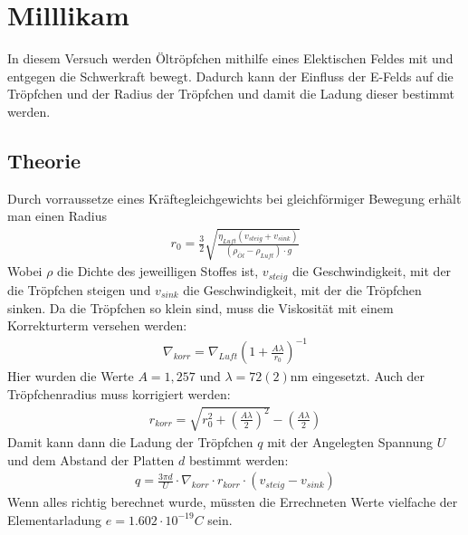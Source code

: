 \documentclass[11pt, a4paper]{article}
\begin{document}
\begin{table}[H]
    

    \section{Milllikam}

    In diesem Versuch werden Öltröpfchen mithilfe eines Elektischen Feldes mit und entgegen die Schwerkraft bewegt. Dadurch kann der Einfluss der E-Felds auf die Tröpfchen und der Radius der Tröpfchen und damit die Ladung dieser bestimmt werden.

    \subsection{Theorie}

    Durch vorraussetze eines Kräftegleichgewichts bei gleichförmiger Bewegung erhält man einen Radius
    \begin{align}
        r_0 = \frac{3}{2} \sqrt{\frac{\eta_{Luft} (v_{steig} + v_{sink})}{(\rho_{\ddot{Ol}} - \rho_{Luft}) \cdot g}}%
    \end{align}
    Wobei $\rho$ die Dichte des jeweilligen Stoffes ist, $v_{steig}$ die Geschwindigkeit, mit der die Tröpfchen steigen und $v_{sink}$ die Geschwindigkeit, mit der die Tröpfchen sinken. Da die Tröpfchen so klein sind, muss die Viskosität mit einem Korrekturterm versehen werden:
    \begin{align}
        \nabla_{korr} = \nabla_{Luft}(1+\frac{A \lambda}{r_0})^{-1}
    \end{align}
    Hier wurden die Werte $A = 1,257$ und $\lambda = 72(2) \si{\nano\metre}$ eingesetzt.
    Auch der Tröpfchenradius muss korrigiert werden:
    \begin{align}
        r_{korr} = \sqrt{r_0^2 + \left(\frac{A \lambda}{2}\right)^2} - \left(\frac{A \lambda}{2}\right)
    \end{align}
    Damit kann dann die Ladung der Tröpfchen $q$ mit der Angelegten Spannung $U$ und dem Abstand der Platten $d$ bestimmt werden:
    \begin{align}
        q = \frac{3 \pi d}{U} \cdot \nabla_{korr} \cdot r_{korr} \cdot \left(v_{steig} - v_{sink}\right)
    \end{align}
    Wenn alles richtig berechnet wurde, müssten die Errechneten Werte vielfache der Elementarladung $e = 1.602 \cdot 10^{-19} \si{C}$ sein.


\end{table}
\end{document}
